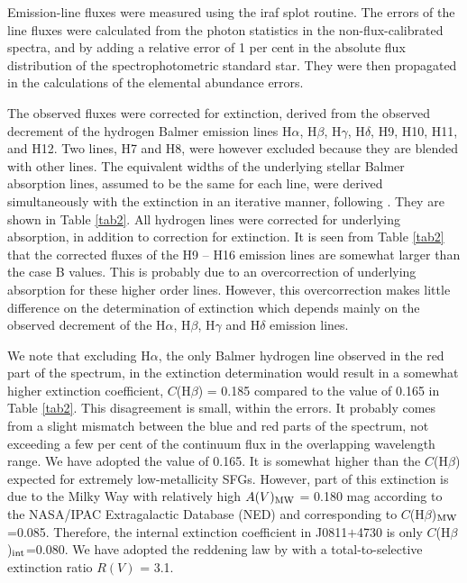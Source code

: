 \documentclass[useAMS,usenatbib]{mn2e}
\begin{document}
Emission-line fluxes were measured using the  {\sc iraf splot} routine. 
The errors of the line fluxes were calculated from the
photon statistics in the non-flux-calibrated spectra, and by adding a 
relative error of 1 per cent in the 
absolute flux distribution of the spectrophotometric standard star.
They were then propagated in the calculations of the elemental 
abundance errors. 





The observed fluxes were corrected for extinction, 
derived from the observed decrement of the hydrogen Balmer emission lines
H$\alpha$, H$\beta$, H$\gamma$, H$\delta$, H9, H10, H11, and H12.
Two lines, H7 and H8, were however excluded because they are blended with
other lines.
The equivalent widths of the underlying stellar Balmer absorption lines, 
assumed to be the same for each line, were derived simultaneously with the 
extinction in an iterative manner, following \citet{ITL94}. They are shown in 
Table \ref{tab2}. All hydrogen lines were corrected for underlying
absorption, in addition to correction for extinction. It is seen from 
Table \ref{tab2} that the corrected fluxes of the H9 -- H16 emission lines
are somewhat larger than the case B values. This is probably due to an 
overcorrection of underlying absorption for these higher order lines. However, 
this overcorrection makes
little difference on the determination of extinction which depends mainly on the
observed decrement of the H$\alpha$, H$\beta$, H$\gamma$ and H$\delta$ emission
lines.

We note that excluding H$\alpha$, the only Balmer 
hydrogen line observed in the red part of the spectrum, in the extinction 
determination would result in a somewhat higher extinction coefficient,  
$C$(H$\beta$) = 0.185 compared to the value of 0.165 in Table \ref{tab2}.
This disagreement is small, within the errors. It probably comes from a slight 
mismatch between the blue and red parts of the spectrum, not exceeding a few
per cent of the continuum flux in the overlapping wavelength range. 
We have adopted the value of 0.165. It is somewhat higher than the $C$(H$\beta$)
expected for extremely low-metallicity SFGs. However, part of this 
extinction is due to the Milky Way with relatively high
$A(V)_{\rm MW}$ = 0.180 mag according to 
the NASA/IPAC Extragalactic Database (NED) and corresponding to 
$C$(H$\beta$)$_{\rm MW}$=0.085. Therefore, the 
internal extinction coefficient in J0811$+$4730 is only
$C$(H$\beta$)$_{\rm int}$=0.080. We have adopted the reddening law by 
\citet*{C89} with a total-to-selective extinction ratio $R(V)$ = 3.1.
\end{document}
